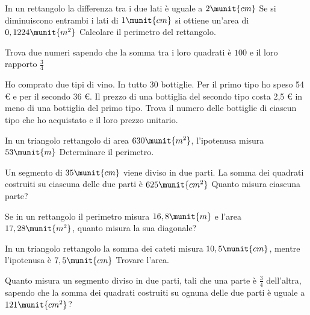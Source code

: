 \begin{htmulticols}{2}
\begin{esercizio}[*]
 \label{ese:6.56}
In un rettangolo la differenza tra i due lati è uguale a \(2\munit{cm}\) Se si diminuiscono entrambi i lati di \( 1\munit{cm} \) si ottiene un'area di \(0,1224\munit{m^2}\) Calcolare il perimetro del rettangolo.
\end{esercizio}

\begin{esercizio}[*]
 \label{ese:6.57}
Trova due numeri sapendo che la somma tra i loro quadrati è \( 100 \) e il loro rapporto \( \frac 3 4 \)
\end{esercizio}

\begin{esercizio}[*]
 \label{ese:6.58}
Ho comprato due tipi di vino. In tutto 30 bottiglie. Per il primo tipo ho speso 54 € e per il secondo 36 €. Il prezzo di una bottiglia del secondo tipo costa 2,5 € in meno di una bottiglia del primo tipo. Trova il numero delle bottiglie di ciascun tipo che ho acquistato e il loro prezzo unitario.
\end{esercizio}

\begin{esercizio}[*]
 \label{ese:6.59}
In un triangolo rettangolo di area \(630\munit{m^2}\), l'ipotenusa misura \(53\munit{m}\) Determinare il perimetro.
\end{esercizio}

\begin{esercizio}[*]
 \label{ese:6.60}
Un segmento di \(35\munit{cm}\) viene diviso in due parti. La somma dei quadrati costruiti su ciascuna delle due parti è \(625\munit{{cm}^2}\) Quanto misura ciascuna parte?
\end{esercizio}

\begin{esercizio}[*]
 \label{ese:6.61}
Se in un rettangolo il perimetro misura \( 16,8\munit{m} \) e l'area \( 17,28\munit{m^2} \), quanto misura la sua diagonale?
\end{esercizio}

\begin{esercizio}[*]
 \label{ese:6.62}
In un triangolo rettangolo la somma dei cateti misura \( 10,5\munit{cm} \), mentre l'ipotenusa è \( 7,5\munit{cm} \) Trovare l'area.
\end{esercizio}

\begin{esercizio}[*]
 \label{ese:6.63}
Quanto misura un segmento diviso in due parti, tali che una parte è \( \frac 3 4 \) dell'altra, sapendo che la somma dei quadrati costruiti su ognuna delle due parti è uguale a \(121\munit{{cm}^2}\)?
\end{esercizio}


\end{htmulticols}
